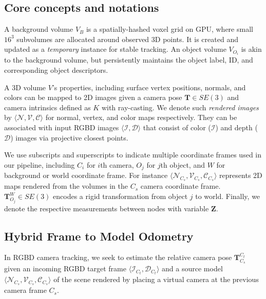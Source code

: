 \subsection{Core concepts and notations} \label{subsec: notation}
A background volume $V_B$ is a spatially-hashed voxel grid on GPU, where small $16^3$ subvolumes are allocated around observed 3D points. It is created and updated as a \textit{temporary} instance for stable tracking. An object volume $V_{O_i}$ is akin to the background volume, but persistently maintains the object label, ID, and corresponding object descriptors.

A 3D volume $V$'s properties, including surface vertex positions, normals, and colors can be mapped to 2D images given a camera pose $\mathbf{T} \in SE(3)$ and camera intrinsics defined as $K$ with ray-casting. We denote such \textit{rendered images} by \( \langle \mathcal{N}, \mathcal{V}, \mathcal{C} \rangle \)  for normal, vertex, and color maps respectively. They can be associated with input RGBD images $\langle \mathcal{I}, \mathcal{D}\rangle $ that consist of color ($\mathcal{I}$) and depth ($\mathcal{D}$) images via projective closest points.

We use subscripts and superscripts to indicate multiple coordinate frames used in our pipeline, including $C_i$ for $i$th camera, $O_j$ for $j$th object, and $W$ for background or world coordinate frame. For instance \(\langle \mathcal{N}_{C_s}, \mathcal{V}_{C_s}, \mathcal{C}_{C_s} \rangle \) represents 2D maps rendered from the volumes in the $C_s$ camera coordinate frame.
$\mathbf{T}_{O_j}^W \in SE(3)$ encodes a rigid transformation from object $j$ to world. Finally, we denote the respective measurements between nodes with variable $\mathbf{Z}$.

\subsection{Hybrid Frame to Model Odometry} \label{subsec: tracking}

In RGBD camera tracking, we seek to estimate the relative camera pose \(\mathbf{T}^{C_t}_{C_s}\) given an incoming RGBD target frame \( \langle \mathcal{I}_{C_t}, \mathcal{D}_{C_t}\rangle \) and a source model \( \langle \mathcal{N}_{C_{s}}, \mathcal{V}_{C_{s}}, \mathcal{C}_{C_{s}}\rangle \) of the scene rendered by placing a virtual camera at the previous camera frame ${C_s}$.

